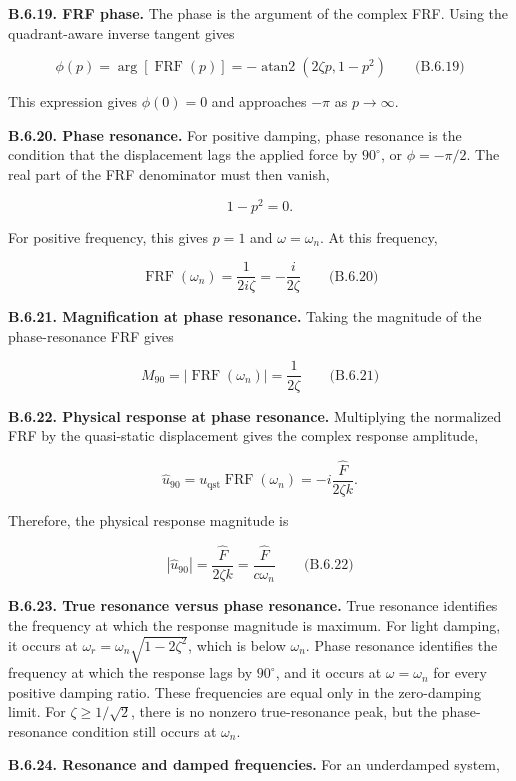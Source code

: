 \textbf{B.6.19. FRF phase.} The phase is the argument of the complex FRF. Using the quadrant-aware inverse tangent gives

\[
\boxed{\phi(p)=\arg\!\left[\operatorname{FRF}(p)\right]
=-\operatorname{atan2}\!\left(2\zeta p,1-p^2\right)}
\qquad\text{(B.6.19)}
\]

This expression gives $\phi(0)=0$ and approaches $-\pi$ as $p\to\infty$.

\textbf{B.6.20. Phase resonance.} For positive damping, phase resonance is the condition that the displacement lags the applied force by $90^\circ$, or $\phi=-\pi/2$. The real part of the FRF denominator must then vanish,

\[
1-p^2=0.
\]

For positive frequency, this gives $p=1$ and $\omega=\omega_n$. At this frequency,

\[
\boxed{\operatorname{FRF}(\omega_n)=\frac{1}{2i\zeta}=-\frac{i}{2\zeta}}
\qquad\text{(B.6.20)}
\]

\textbf{B.6.21. Magnification at phase resonance.} Taking the magnitude of the phase-resonance FRF gives

\[
\boxed{M_{90}=\left|\operatorname{FRF}(\omega_n)\right|=\frac{1}{2\zeta}}
\qquad\text{(B.6.21)}
\]

\textbf{B.6.22. Physical response at phase resonance.} Multiplying the normalized FRF by the quasi-static displacement gives the complex response amplitude,

\[
\hat{u}_{90}=u_{\mathrm{qst}}\operatorname{FRF}(\omega_n)
=-i\frac{\hat{F}}{2\zeta k}.
\]

Therefore, the physical response magnitude is

\[
\boxed{\left|\hat{u}_{90}\right|=\frac{\hat{F}}{2\zeta k}
=\frac{\hat{F}}{c\omega_n}}
\qquad\text{(B.6.22)}
\]

\textbf{B.6.23. True resonance versus phase resonance.} True resonance identifies the frequency at which the response magnitude is maximum. For light damping, it occurs at $\omega_r=\omega_n\sqrt{1-2\zeta^2}$, which is below $\omega_n$. Phase resonance identifies the frequency at which the response lags by $90^\circ$, and it occurs at $\omega=\omega_n$ for every positive damping ratio. These frequencies are equal only in the zero-damping limit. For $\zeta\geq1/\sqrt{2}$, there is no nonzero true-resonance peak, but the phase-resonance condition still occurs at $\omega_n$.

\textbf{B.6.24. Resonance and damped frequencies.} For an underdamped system,


